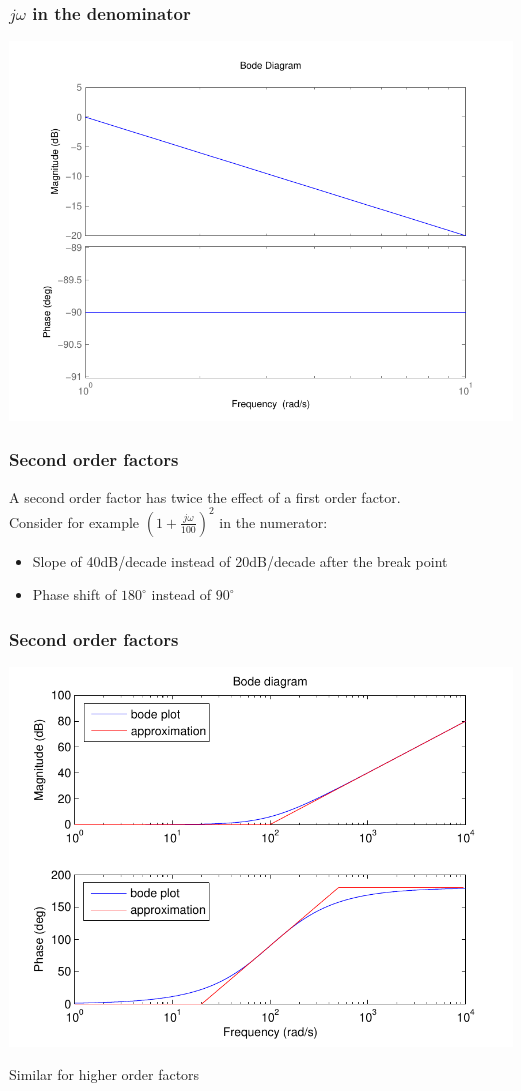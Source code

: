 \begin{frame}
\frametitle{$j\omega$ in the denominator}

\includegraphics[scale=0.5]{BodeZeroDen}

\end{frame}



\begin{frame}
\frametitle{Second order factors}
A second order factor has twice the effect of a first order factor.\\
Consider for example $(1+\frac{j\omega}{100})^2$ in the numerator:
\begin{itemize}
\item Slope of 40dB/decade instead of 20dB/decade after the break point
\item Phase shift of $180^{\circ}$ instead of $90^{\circ}$

\end{itemize}
\end{frame}

\begin{frame}
\frametitle{Second order factors}

\includegraphics[scale=0.5]{BodeSecondOrder}

Similar for higher order factors

\end{frame}


